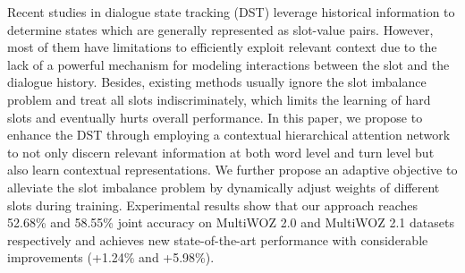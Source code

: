 Recent studies in dialogue state tracking (DST) leverage historical information to determine states which are generally represented as slot-value pairs. However, most of them have limitations to efficiently exploit relevant context due to the lack of a powerful mechanism for modeling interactions between the slot and the dialogue history. Besides, existing methods usually ignore the slot imbalance problem and treat all slots indiscriminately, which limits the learning of hard slots and eventually hurts overall performance. In this paper, we propose to enhance the DST through employing a contextual hierarchical attention network to not only discern relevant information at both word level and turn level but also learn contextual representations. We further propose an adaptive objective to alleviate the slot imbalance problem by dynamically adjust weights of different slots during training. Experimental results show that our approach reaches 52.68\% and 58.55\% joint accuracy on MultiWOZ 2.0 and MultiWOZ 2.1 datasets respectively and achieves new state-of-the-art performance with considerable improvements (+1.24\% and +5.98\%).
